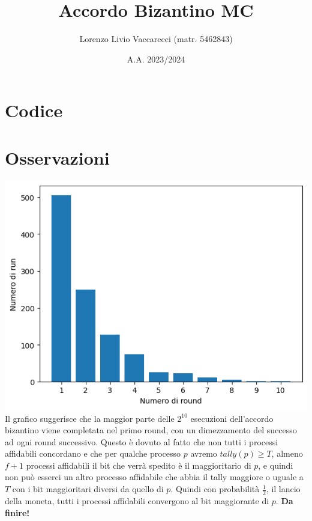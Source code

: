 \documentclass[12pt]{article}
\title{Accordo Bizantino MC}
\author{Lorenzo Livio Vaccarecci (matr. 5462843)}
\date{A.A. 2023/2024}
\begin{document}
\maketitle
\section{Codice}

\section{Osservazioni}
\includegraphics[width=\textwidth]{Grafico.png}
Il grafico suggerisce che la maggior parte delle $2^{10}$ esecuzioni dell'accordo bizantino viene completata nel primo round, con un dimezzamento del successo ad ogni round successivo. Questo è dovuto al fatto che non tutti i processi affidabili concordano e che per qualche processo $p$ avremo $tally(p)\geq T$, almeno $f+1$ processi affidabili il bit che verrà spedito è il maggioritario di $p$, e quindi non può esserci un altro processo affidabile che abbia il tally maggiore o uguale a $T$ con i bit maggioritari diversi da quello di $p$. Quindi con probabilità $\frac{1}{2}$, il lancio della moneta, tutti i processi affidabili convergono al bit maggiorante di $p$. \textbf{Da finire!}
\end{document}
